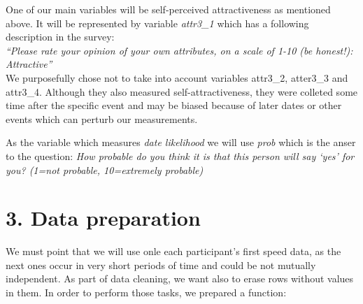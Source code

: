 \documentclass[]{article}
\newenvironment{Shaded}{\begin{snugshade}}{\end{snugshade}}
\newcommand{\ControlFlowTok}[1]{\textcolor[rgb]{0.13,0.29,0.53}{\textbf{#1}}}
\newcommand{\DataTypeTok}[1]{\textcolor[rgb]{0.13,0.29,0.53}{#1}}
\newcommand{\DecValTok}[1]{\textcolor[rgb]{0.00,0.00,0.81}{#1}}
\newcommand{\KeywordTok}[1]{\textcolor[rgb]{0.13,0.29,0.53}{\textbf{#1}}}
\newcommand{\NormalTok}[1]{#1}
\newcommand{\OperatorTok}[1]{\textcolor[rgb]{0.81,0.36,0.00}{\textbf{#1}}}
\newcommand{\StringTok}[1]{\textcolor[rgb]{0.31,0.60,0.02}{#1}}
\begin{document}
One of our main variables will be self-perceived attractiveness as
mentioned above. It will be represented by variable \emph{attr3\_1}
which has a following description in the survey:\\
\emph{``Please rate your opinion of your own attributes, on a scale of
1-10 (be honest!): Attractive''}\\
We purposefully chose not to take into account variables attr3\_2,
atter3\_3 and attr3\_4. Although they also measured self-attractiveness,
they were colleted some time after the specific event and may be biased
because of later dates or other events which can perturb our
measurements.

As the variable which measures \emph{date likelihood} we will use
\emph{prob} which is the anser to the question: \emph{How probable do
you think it is that this person will say `yes' for you? (1=not
probable, 10=extremely probable)}

\hypertarget{data-preparation}{%
\section{3. Data preparation}\label{data-preparation}}

We must point that we will use onle each participant's first speed data,
as the next ones occur in very short periods of time and could be not
mutually independent. As part of data cleaning, we want also to erase
rows without values in them. In order to perform those tasks, we
prepared a function:

\begin{Shaded}
\end{Shaded}
\end{document}
